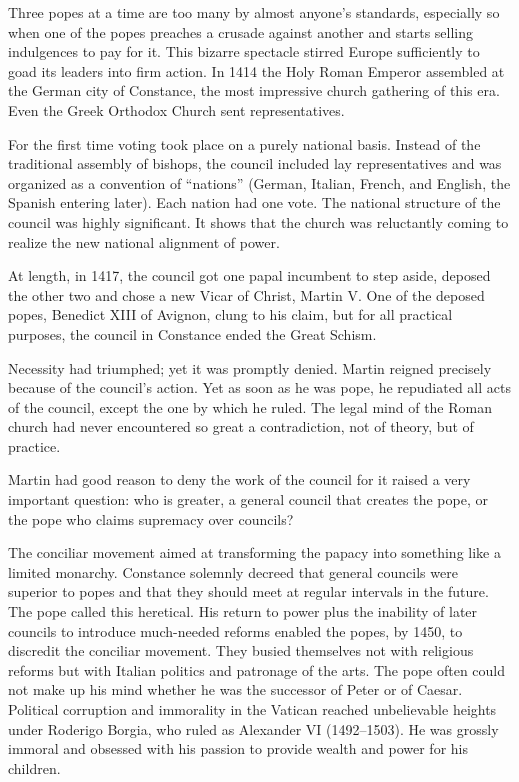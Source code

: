 Three popes at a time are too many by almost anyone’s standards, especially so when one of the popes
preaches a crusade against another and starts selling indulgences to pay for it. This bizarre
spectacle stirred Europe sufficiently to goad its leaders into firm action. In 1414 the Holy Roman
Emperor assembled at the German city of Constance, the most impressive church gathering of this era.
Even the Greek Orthodox Church sent representatives.


For the first time voting took place on a purely national basis. Instead of the traditional assembly
of bishops, the council included lay representatives and was organized as a convention of “nations”
(German, Italian, French, and English, the Spanish entering later). Each nation had one vote. The
national structure of the council was highly significant. It shows that the church was reluctantly
coming to realize the new national alignment of power.

At length, in 1417, the council got one papal incumbent to step aside, deposed the other two and
chose a new Vicar of Christ, Martin V. One of the deposed popes, Benedict XIII of Avignon, clung to
his claim, but for all practical purposes, the council in Constance ended the Great Schism.

Necessity had triumphed; yet it was promptly denied. Martin reigned precisely because of the
council’s action. Yet as soon as he was pope, he repudiated all acts of the council, except the one
by which he ruled. The legal mind of the Roman church had never encountered so great a
contradiction, not of theory, but of practice.

Martin had good reason to deny the work of the council for it raised a very important question: who
is greater, a general council that creates the pope, or the pope who claims supremacy over councils?

The conciliar movement aimed at transforming the papacy into something like a limited monarchy.
Constance solemnly decreed that general councils were superior to popes and that they should meet at
regular intervals in the future. The pope called this heretical. His return to power plus the
inability of later councils to introduce much-needed reforms enabled the popes, by 1450, to
discredit the conciliar movement. They busied themselves not with religious reforms but with Italian
politics and patronage of the arts. The pope often could not make up his mind whether he was the
successor of Peter or of Caesar. Political corruption and immorality in the Vatican reached
unbelievable heights under Roderigo Borgia, who ruled as Alexander VI (1492–1503). He was grossly
immoral and obsessed with his passion to provide wealth and power for his children.

